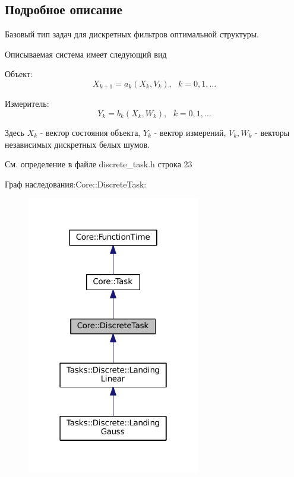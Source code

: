 \subsection{Подробное описание}
Базовый тип задач для дискретных фильтров оптимальной структуры. 

Описываемая система имеет следующий вид


\begin{DoxyItemize}
\item Объект\+: \[X_{k+1} = a_k(X_k, V_k),\ \ \ k = 0, 1, \ldots\]
\item Измеритель\+: \[Y_k = b_k(X_k, W_k),\ \ \ k = 0, 1, \ldots\]
\end{DoxyItemize}

Здесь $X_k$ -\/ вектор состояния объекта, $Y_k$ -\/ вектор измерений, $V_k, W_k$ -\/ векторы независимых дискретных белых шумов. 

См. определение в файле discrete\+\_\+task.\+h строка 23



Граф наследования\+:Core\+:\+:Discrete\+Task\+:
\nopagebreak
\begin{figure}[H]
\begin{center}
\leavevmode
\includegraphics[width=214pt]{class_core_1_1_discrete_task__inherit__graph}
\end{center}
\end{figure}


